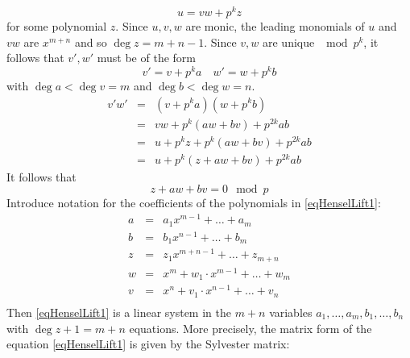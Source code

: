 \documentclass{article}
\begin{document}
\[ 
u = vw + p^k z 
\]
for some polynomial \(z\). Since \(u,v,w\) are monic, the leading monomials of \(u\) and \(vw\) are $x^{m+n}$ and so $\deg z = m + n - 1$. Since  \(v, w\) are unique \(\mod p^{k}\), it follows that \(v', w'\) must be of the form 
\[
v' = v + p^{k} a \quad w' = w+ p^k b
\]
with \(\deg a < \deg v= m\) and \(\deg b < \deg w = n\). 
\begin{equation}\label{eqHenselLift0}
\begin{array}{rcl}
v' w'& =& \left(v+p^k a\right)\left(w + p^k b\right) \\
&=&vw + p^k(aw + bv) + p^{2k} ab\\
&=&u + p^{k}z + p^{k}(aw+bv) + p^{2k}ab\\
&=&u + p^{k}\left( z + aw + bv\right) + p^{2k}ab
\end{array}
\end{equation}
It follows that 
\begin{equation}\label{eqHenselLift1}
z + aw + bv = 0 \mod p
\end{equation} 
Introduce notation for the coefficients of the polynomials in \eqref{eqHenselLift1}:
\begin{equation}
\begin{array}{rcl}
a &=& a_{1} x^{m-1} + \dots + a_m\\
b &=& b_{1} x^{n-1} + \dots + b_m \\
z &=& z_{1}x^{m + n - 1} + \dots +z_{m+n}\\
w &=& x^{m} + w_{1} \cdot x^{m - 1} + \dots + w_{m}\\
v &=& x^{n} + v_{1} \cdot x^{n - 1} + \dots + v_{n}\\
\end{array}
\end{equation}
Then \eqref{eqHenselLift1} is a linear system in the \(m+n\) variables \(a_1, \dots, a_m, b_1, \dots, b_n\) with $\deg z + 1 = m + n $ equations. More precisely, the matrix form of the equation \eqref{eqHenselLift1} is given by the Sylvester matrix:
\end{document}
